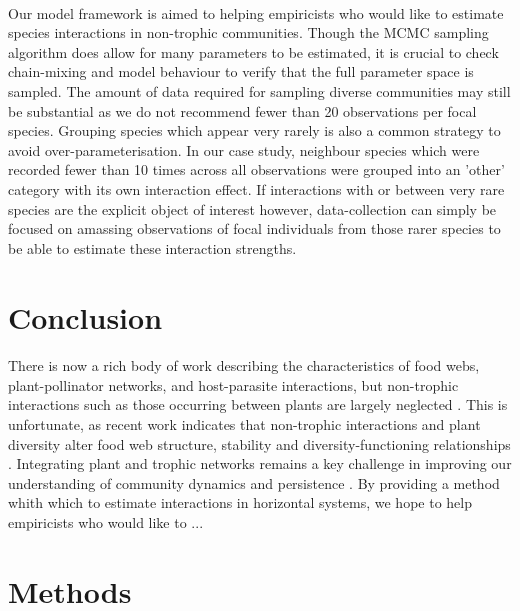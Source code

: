 \documentclass[a4,12pt]{article}
\begin{document}
\begin{itemize}
        \paragraph{}
        Our model framework is aimed to helping empiricists who would like to estimate species interactions in non-trophic communities. Though the MCMC sampling algorithm does allow for many parameters to be estimated, it is crucial to check chain-mixing and model behaviour to verify that the full parameter space is sampled. The amount of data required for sampling diverse communities may still be substantial as we do not recommend fewer than 20 observations per focal species. Grouping species which appear very rarely is also a common strategy to avoid over-parameterisation. In our case study, neighbour species which were recorded fewer than 10 times across all observations were grouped into an 'other' category with its own interaction effect. If interactions with or between very rare species are the explicit object of interest however, data-collection can simply be focused on amassing observations of focal individuals from those rarer species to be able to estimate these interaction strengths.   

\section{Conclusion}

    \paragraph{} 
    There is now a rich body of work describing the characteristics of food webs, plant-pollinator networks, and host-parasite interactions, but non-trophic interactions such as those occurring between plants are largely neglected \parencite{Ellison2019}. This is unfortunate, as recent work indicates that non-trophic interactions and plant diversity alter food web structure, stability and diversity-functioning relationships \parencite{Hammill2015, Giling2019, Zhao2019, Miele2019}. Integrating plant and trophic networks remains a key challenge in improving our understanding of community dynamics and persistence \parencite{Godoy2018c}. By providing a method whith which to estimate interactions in horizontal systems, we hope to help empiricists who would like to ...


    
\section{Methods}


\end{itemize}
\end{document}
